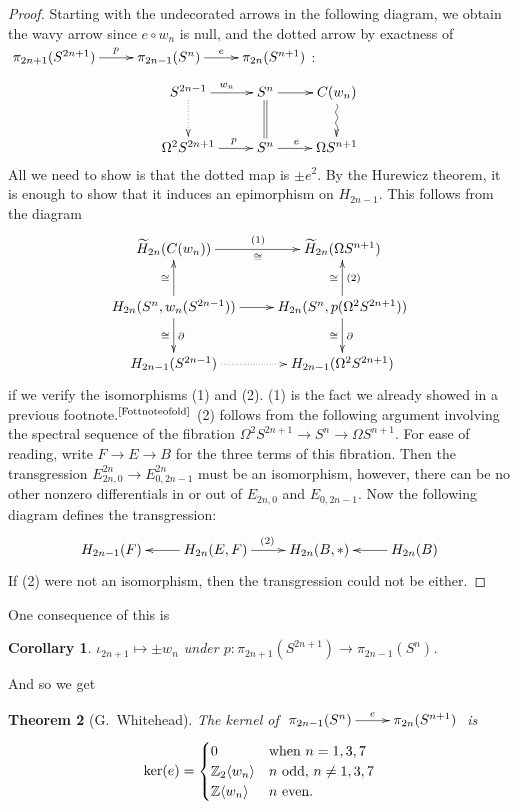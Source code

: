 \documentclass{article}
\newcommand{\Z}{\mathbb{Z}}
\newcommand{\Loops}{\Omega}
\newtheorem{thm}{Theorem}[section]
\newtheorem{cor}[thm]{Corollary}
\begin{document}
\begin{proof}
Starting with the undecorated arrows in the following diagram, we obtain the wavy arrow since $e\circ w_n$ is null, and the dotted arrow by exactness of  $\xymatrix{\pi_{2n+1}(S^{2n+1})\ar[r]^{\ \ p}&\pi_{2n-1}(S^n)\ar[r]^e&\pi_{2n}(S^{n+1})}$:
\[\xymatrix{
\ar@{..>}[d]S^{2n-1}  \ar[r]^{w_n} & S^n \ar[r]\ar@{=}[d] & C(w_n)\ar@{~>}[d] \\
\Loops^2 S^{2n+1} \ar[r]^{\ \ \ p} & S^n \ar[r]^{e\ \ } & \Loops S^{n+1}
}\]
All we need to show is that the dotted map is $\pm e^2$. By the Hurewicz theorem, it is enough to show that it induces an epimorphism on $H_{2n-1}$. This follows from the diagram
\[\xymatrix{
\widetilde H_{2n} (C (w_n)) \ar[r]^{(1)}_\cong & \widetilde H_{2n} (\Loops S^{n+1}) \\
H_{2n}(S^n, w_n (S^{2n-1})) \ar[r] 
\ar[u]^{\cong}\ar[d]_\cong^\partial
& H_{2n}(S^n, p(\Loops^2 S^{2n+1}) )
\ar[u]^{\cong}_{(2)}\ar[d]_\cong^\partial
\\
H_{2n-1} (S^{2n-1}) \ar@{..>}[r] & H_{2n-1} (\Loops^2 S^{2n+1})
}\]
if we verify the isomorphisms (1) and (2).  (1) is the fact we already showed in a previous footnote.$^\text{\ref{Fottnoteofold}}$  (2) follows from the following argument involving the spectral sequence of the fibration $\Loops^2 S^{2n+1} \to S^n \to \Loops S^{n+1}$. For ease of reading, write $F\to E\to B$ for the three terms of this fibration. Then the transgression $E^{2n}_{2n,0}\to E^{2n}_{0,2n-1}$ must be an isomorphism, however, there can be no other nonzero differentials in or out of $E_{2n,0}$ and $E_{0,2n-1}$. Now the following diagram defines the transgression:
\[\xymatrix{
H_{2n-1}(F)&\ar[l]H_{2n}(E,F)\ar[r]^{(2)}&H_{2n}(B,*)&%
H_{2n}(B)\ar[l]
}\]
If (2) were not an isomorphism, then the transgression could not be either.
\end{proof}
One consequence of this is
\begin{cor}
$\iota_{2n+1} \mapsto \pm w_n$ under $p:\pi_{2n+1}(S^{2n+1})\to\pi_{2n-1}(S^n)$.
\end{cor}
And so we get
\begin{thm}[G.\ Whitehead]
The kernel of $\xymatrix{\pi_{2n-1}(S^n)\ar[r]^e&\pi_{2n}(S^{n+1})}$\!\! is
%
\[
\ker(e) = \begin{cases} 0 & \hbox{when $n = 1, 3, 7$} \\ \Z_2 \langle w_n \rangle & \hbox{$n$ odd, $n\neq1,3,7$} \\ \Z \langle w_n \rangle & \hbox{$n$ even}. \end{cases}
\]
\end{thm}
\end{document}
